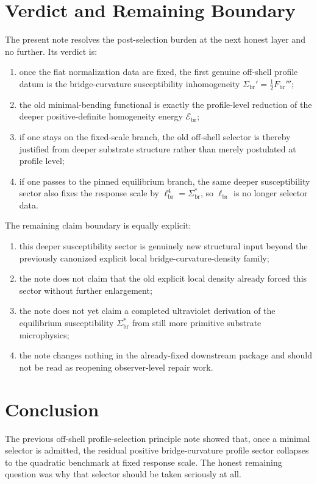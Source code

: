 \documentclass[11pt]{article}
\newcommand{\CurvScale}{\ell_{\mathrm{br}}}
\newcommand{\CurvProfile}{F_{\mathrm{br}}}
\newcommand{\RespSus}{\Sigma_{\mathrm{br}}}
\newcommand{\RespSusEq}{\Sigma_{\mathrm{br}}^{\ast}}
\newcommand{\RespEnergy}{\mathscr E_{\mathrm{br}}}
\begin{document}
\section{Verdict and Remaining Boundary}

The present note resolves the post-selection burden at the next honest layer and no further. Its verdict is:
\begin{enumerate}
    \item once the flat normalization data are fixed, the first genuine off-shell profile datum is the bridge-curvature susceptibility inhomogeneity \(\RespSus'=\frac12\CurvProfile'''\);
    \item the old minimal-bending functional is exactly the profile-level reduction of the deeper positive-definite homogeneity energy \(\RespEnergy\);
    \item if one stays on the fixed-scale branch, the old off-shell selector is thereby justified from deeper substrate structure rather than merely postulated at profile level;
    \item if one passes to the pinned equilibrium branch, the same deeper susceptibility sector also fixes the response scale by \(\CurvScale^4=\RespSusEq\), so \(\CurvScale\) is no longer selector data.
\end{enumerate}

The remaining claim boundary is equally explicit:
\begin{enumerate}
    \item this deeper susceptibility sector is genuinely new structural input beyond the previously canonized explicit local bridge-curvature-density family;
    \item the note does not claim that the old explicit local density already forced this sector without further enlargement;
    \item the note does not yet claim a completed ultraviolet derivation of the equilibrium susceptibility \(\RespSusEq\) from still more primitive substrate microphysics;
    \item the note changes nothing in the already-fixed downstream package and should not be read as reopening observer-level repair work.
\end{enumerate}

\section{Conclusion}

The previous off-shell profile-selection principle note showed that, once a minimal selector is admitted, the residual positive bridge-curvature profile sector collapses to the quadratic benchmark at fixed response scale. The honest remaining question was why that selector should be taken seriously at all.
\end{document}
